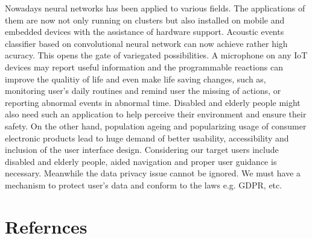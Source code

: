 \documentclass[12pt]{scrartcl}
\begin{document}
Nowadays neural networks has been applied to various fields. The applications of them are now not only running on clusters but also installed on mobile and embedded devices with the assistance of hardware support\cite{moons2019embedded}. Acoustic events classifier based on convolutional neural network can now achieve rather high acuracy\cite{sampath2019cnn}. This opens the gate of variegated possibilities. A microphone on any IoT devices may report useful information and the programmable reactions can improve the qualitiy of life and even make life saving changes, such as, monitoring user's daily routines and remind user the missing of actions, or reporting abnormal events in abnormal time. Disabled and elderly people might also need such an application to help perceive their environment and ensure their safety. On the other hand, population ageing and popularizing usage of consumer electronic products lead to huge demand of better usability, accessibility and inclusion of the user interface design. Considering our target users include disabled and elderly people, aided navigation and proper user guidance is necessary. Meanwhile the data privacy issue cannot be ignored. We must have a mechanism to protect user's data and conform to the laws e.g. GDPR, etc.

\section*{Refernces}
\printbibliography[heading=none]
\end{document}
